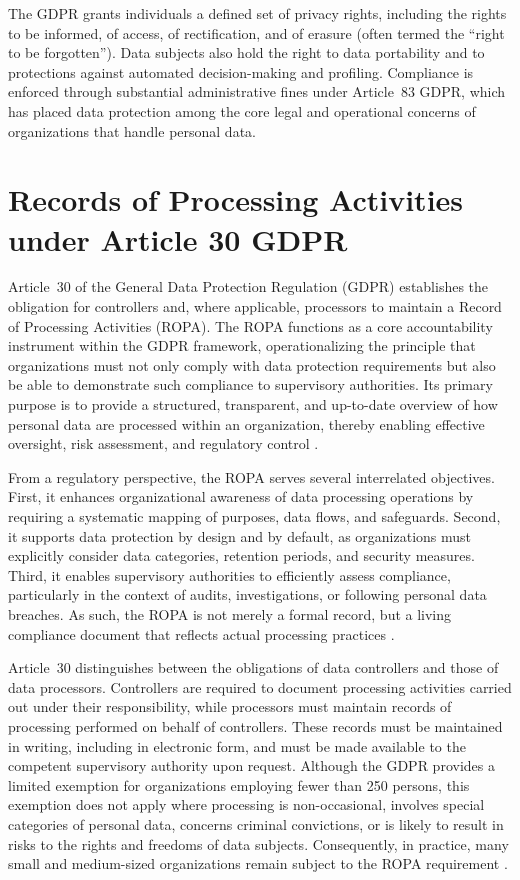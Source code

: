The GDPR grants individuals a defined set of privacy rights, including the rights to be informed, of access, of rectification, and of erasure (often termed the ``right to be forgotten''). Data subjects also hold the right to data portability and to protections against automated decision-making and profiling. Compliance is enforced through substantial administrative fines under Article~83 GDPR, which has placed data protection among the core legal and operational concerns of organizations that handle personal data.~\cite{gdpr-eu-overview}



\section{Records of Processing Activities under Article 30 GDPR}

Article~30 of the General Data Protection Regulation (GDPR) establishes the obligation for controllers and, where applicable, processors to maintain a Record of Processing Activities (ROPA). The ROPA functions as a core accountability instrument within the GDPR framework, operationalizing the principle that organizations must not only comply with data protection requirements but also be able to demonstrate such compliance to supervisory authorities. Its primary purpose is to provide a structured, transparent, and up-to-date overview of how personal data are processed within an organization, thereby enabling effective oversight, risk assessment, and regulatory control \cite{gdpr-info-art30, schwerinSystematicComparisonOpen2024}.

From a regulatory perspective, the ROPA serves several interrelated objectives. First, it enhances organizational awareness of data processing operations by requiring a systematic mapping of purposes, data flows, and safeguards. Second, it supports data protection by design and by default, as organizations must explicitly consider data categories, retention periods, and security measures. Third, it enables supervisory authorities to efficiently assess compliance, particularly in the context of audits, investigations, or following personal data breaches. As such, the ROPA is not merely a formal record, but a living compliance document that reflects actual processing practices \cite{gdpr-info-art30}.

Article~30 distinguishes between the obligations of data controllers and those of data processors. Controllers are required to document processing activities carried out under their responsibility, while processors must maintain records of processing performed on behalf of controllers. These records must be maintained in writing, including in electronic form, and must be made available to the competent supervisory authority upon request. Although the GDPR provides a limited exemption for organizations employing fewer than 250 persons, this exemption does not apply where processing is non-occasional, involves special categories of personal data, concerns criminal convictions, or is likely to result in risks to the rights and freedoms of data subjects. Consequently, in practice, many small and medium-sized organizations remain subject to the ROPA requirement \cite{gdpr-info-art30}.

